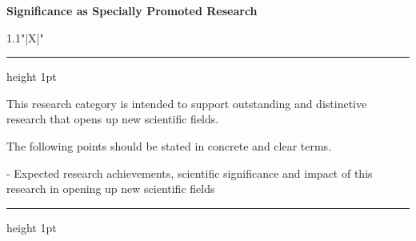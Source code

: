 \documentclass[8pt]{extarticle}
\makeatletter
\newcommand{\thickhline}{%
	\noalign {\ifnum 0=`}\fi \hrule height 1pt
	\futurelet \reserved@a \@xhline
}
\makeatother
\begin{document}
	
\noindent\textbf{\fontsize{12}{12}\selectfont Significance as Specially Promoted Research}\\
\begin{tabularx}{1.1\linewidth}{"|X|"}
	\thickhline
	This research category is intended to support outstanding and distinctive research that opens up new scientific fields.
	
	The following points should be stated in concrete and clear terms.
	
	- Expected research achievements, scientific significance and impact of this research in opening up new scientific fields
	\\
	\thickhline
\end{tabularx}
\end{document}
